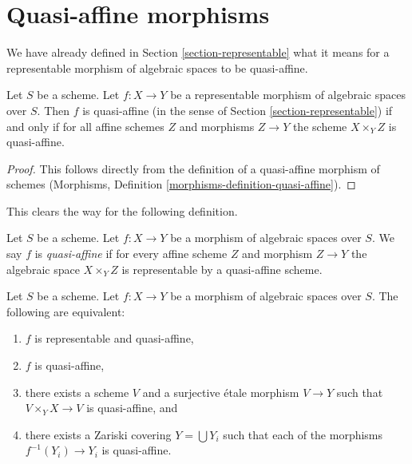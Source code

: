 \section{Quasi-affine morphisms}
\label{section-quasi-affine}

\noindent
We have already defined in Section \ref{section-representable}
what it means for a representable morphism of algebraic spaces
to be quasi-affine.

\begin{lemma}
\label{lemma-quasi-affine-representable}
Let $S$ be a scheme. Let $f : X \to Y$ be a representable
morphism of algebraic spaces over $S$. Then
$f$ is quasi-affine (in the sense of Section \ref{section-representable})
if and only if for all affine schemes $Z$
and morphisms $Z \to Y$ the scheme $X \times_Y Z$ is quasi-affine.
\end{lemma}

\begin{proof}
This follows directly from the definition of a quasi-affine morphism
of schemes
(Morphisms, Definition \ref{morphisms-definition-quasi-affine}).
\end{proof}

\noindent
This clears the way for the following definition.

\begin{definition}
\label{definition-quasi-affine}
Let $S$ be a scheme.
Let $f : X \to Y$ be a morphism of algebraic spaces over $S$.
We say $f$ is {\it quasi-affine} if for every affine scheme $Z$ and
morphism $Z \to Y$ the algebraic space $X \times_Y Z$ is representable
by a quasi-affine scheme.
\end{definition}

\begin{lemma}
\label{lemma-quasi-affine-local}
Let $S$ be a scheme.
Let $f : X \to Y$ be a morphism of algebraic spaces over $S$.
The following are equivalent:
\begin{enumerate}
\item $f$ is representable and quasi-affine,
\item $f$ is quasi-affine,
\item there exists a scheme $V$ and a surjective \'etale morphism
$V \to Y$ such that $V \times_Y X \to V$ is quasi-affine, and
\item there exists a Zariski covering $Y = \bigcup Y_i$ such
that each of the morphisms $f^{-1}(Y_i) \to Y_i$ is quasi-affine.
\end{enumerate}
\end{lemma}

